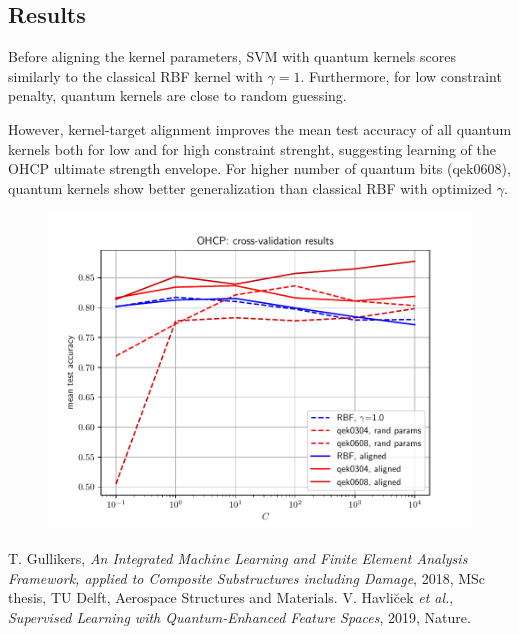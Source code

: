 \documentclass[9pt,a4paper]{extarticle}
\begin{document}
\begin{multicols}{2}
\section{Results}

Before aligning the kernel parameters, SVM with quantum kernels scores similarly to the classical RBF kernel with $\gamma=1$. Furthermore, for low constraint penalty, quantum kernels are close to random guessing.

However, kernel-target alignment improves the mean test accuracy of all quantum kernels both for low and for high constraint strenght, suggesting learning of the OHCP ultimate strength envelope. For higher number of quantum bits (qek0608), quantum kernels show better generalization than classical RBF with optimized $\gamma$.

\begin{figure}[H]
    \centering
    \includegraphics[width=.45\textwidth]{pics/cv-accuracy.pdf}
\end{figure}


\begin{thebibliography}{99}
    T. Gullikers, \emph{An Integrated Machine Learning and Finite
    Element Analysis Framework, applied to
    Composite Substructures including Damage}, 2018, MSc thesis, TU Delft, Aerospace Structures and Materials.
    V. Havli\u{c}ek \emph{et al.}, \emph{Supervised Learning with Quantum-Enhanced Feature Spaces}, 2019, Nature.
\end{thebibliography}

\end{multicols}
\end{document}
